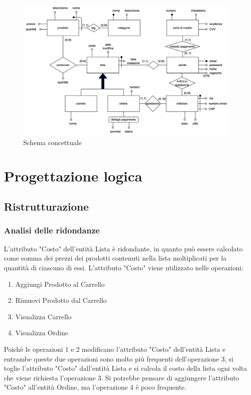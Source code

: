 \documentclass[11pt]{article}
\begin{document}
\begin{figure}[H]
	\centering
	\includegraphics[width=\textwidth]{schema_concettuale}
	\caption{Schema concettuale}
\end{figure}

\section{Progettazione logica}

\subsection{Ristrutturazione}

\subsubsection{Analisi delle ridondanze}

L'attributo "Costo" dell'entità Lista è ridondante, in quanto può essere
calcolato come somma dei prezzi dei prodotti contenuti nella lista moltiplicati
per la quantità di ciascuno di essi. L'attributo "Costo" viene utilizzato nelle
operazioni:
\begin{enumerate}
	\item Aggiungi Prodotto al Carrello
	\item Rimuovi Prodotto dal Carrello
	\item Visualizza Carrello
	\item Visualizza Ordine
\end{enumerate}

Poichè le operazioni 1 e 2 modificano l'attributo "Costo" dell'entità Lista e
entrambe queste due operazioni sono molto più frequenti dell'operazione 3, si
toglie l'attributo "Costo" dall'entità Lista e si calcola il costo della lista
ogni volta che viene richiesta l'operazione 3. Si potrebbe pensare di aggiungere
l'attributo "Costo" all'entità Ordine, ma l'operazione 4 è poco frequente.
\end{document}

